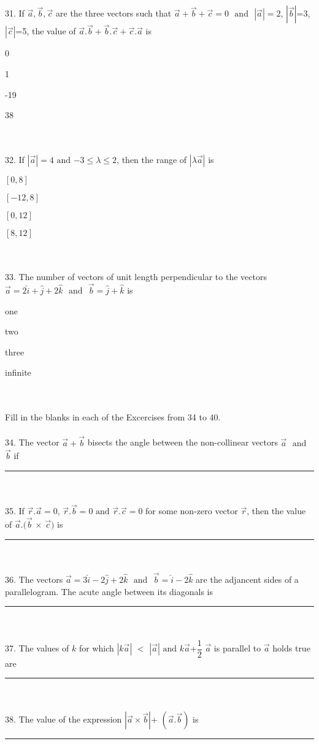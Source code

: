 \documentclass{article}
\newcommand{\choice}{\item}
\begin{document}
\\
\\
31. If $\vec{a},\vec{b},\vec{c}$ are the three vectors such that $\vec{a}+\vec{b}+\vec{c}=0$ $\text{ and }$ $|\vec{a}|=2$, $|\vec{b}|$=3, $|\vec{c}|$=5, the value of $\vec{a}.\vec{b}+\vec{b}.\vec{c}+\vec{c}.\vec{a}$ is
\begin {choices}[fourcol]
\choice 0
\choice 1	
\choice -19
\choice 38
\end{choices}
\\
\\
32. If $|\vec{a}|=4$ $\text{and}$  $-3\leq\lambda\leq2$, then the range of $|\lambda\vec{a}|$ is
\begin {choices}[fourcol]
\choice $\left[0,8\right]$
\choice $\left[-12,8\right]$
\choice $\left[0,12\right]$	
\choice $\left[8,12\right]$
\end{choices}
\\
\\
33. The number of vectors of unit length perpendicular to the vectors $\vec{a}=2\hat{i}+\hat{j}+2\hat{k}$ $\text{ and }$ $\vec{b}=\hat{j}+\hat{k}$ is
\begin {choices}[fourcol]
\choice  one
\choice  two
\choice three
\choice infinite
\end{choices}
\\
\\
Fill in the blanks in each of the Excercises from 34 to 40.
\\
\\
34. The vector $\vec{a}+\vec{b}$ bisects the angle between the non-collinear vectors $\vec{a}$ $\text{ and }$ $\vec{b}$ if \rule{1cm}{0.15mm}
\\
\\
35. If $\vec{r}.\vec{a}=0$, $\vec{r}.\vec{b}=0$ $\text{and}$ $\vec{r}.\vec{c}=0$ for some non-zero vector $\vec{r}$, then the value of $\vec{a}.(\vec{b}$ $\times$ $\vec{c})$ is \rule{1cm}{0.15mm}
\\
\\
36. The vectors $\vec{a}=3\hat{i}-2\hat{j}+2\hat{k}$ $\text{ and }$ $\vec{b}=\hat{i}-2\hat{k}$ are the adjancent sides of a parallelogram. The acute angle between its diagonals is \rule{1cm}{0.15mm}
\\
\\
37. The values of $k$ for which $|k\vec{a}|$ $<$ $|\vec{a}|$ $\text{and}$ $k\vec{a}$+$\dfrac{1}{2}$ $\vec{a}$ is parallel to $\vec{a}$ holds true are \rule{1cm}{0.15mm}
\\
\\
38. The value of the expression $|\vec{a}\times\vec{b}|$+ $(\vec{a}.\vec{b})$ is \rule{1cm}{0.15mm}
\end{document}
